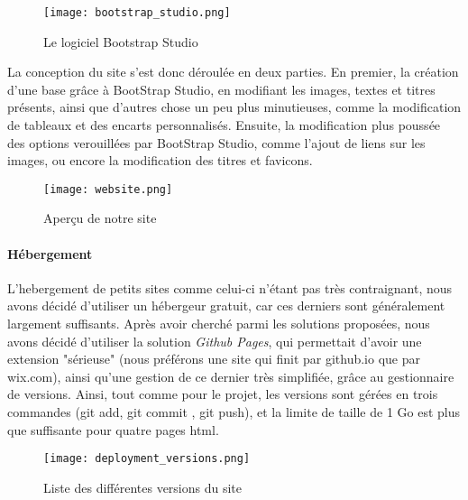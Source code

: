            \begin{figure}[hbt!]
                \centering
                \texttt{[image: bootstrap\_studio.png]}
                \caption{Le logiciel Bootstrap Studio}
            \end{figure}

            La conception du site s'est donc déroulée en deux parties. En premier, la création
            d'une base grâce à BootStrap Studio, en modifiant les images, textes et titres présents, ainsi
            que d'autres chose un peu plus minutieuses, comme la modification de tableaux et des encarts personnalisés.
            Ensuite, la modification plus poussée des options verouillées par BootStrap Studio, comme l'ajout de liens 
            sur les images, ou encore la modification des titres et favicons.

            \begin{figure}[hbt!]
                \centering
                \texttt{[image: website.png]}
                \caption{Aperçu de notre site}
            \end{figure}
            \FloatBarrier


        \paragraph{Hébergement}

            L'hebergement de petits sites comme celui-ci n'étant pas très contraignant,
            nous avons décidé d'utiliser un hébergeur gratuit, car ces derniers
            sont généralement largement suffisants. Après avoir cherché parmi les
            solutions proposées, nous avons décidé d'utiliser la solution 
            \textit{Github Pages}, qui permettait d'avoir une extension "sérieuse"
            (nous préférons une site qui finit par github.io que par wix.com),
            ainsi qu'une gestion de ce dernier très simplifiée, grâce au gestionnaire de versions.
            Ainsi, tout comme pour le projet, les versions sont gérées en trois commandes 
            (git add, git commit , git push), et la limite de taille de 1 Go est plus que suffisante pour quatre pages html. 


        \begin{figure}[hbt!]
            \centering
            \texttt{[image: deployment\_versions.png]}
            \caption{Liste des différentes versions du site}
        \end{figure}
        \FloatBarrier

